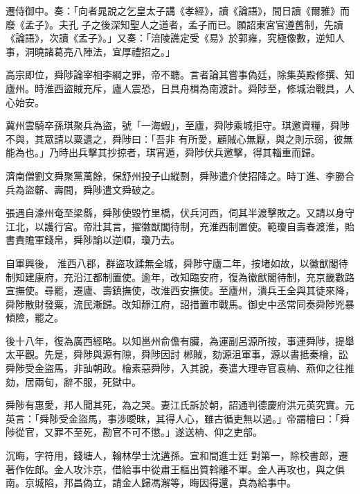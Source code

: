 \begin{pinyinscope}
 遷侍御中。奏：「向者晁說之乞皇太子講《孝經》，讀《論語》，間日讀《爾雅》而廢《孟子》。夫孔
 子之後深知聖人之道者，孟子而已。願詔東宮官遵舊制，先讀《論語》，次讀《孟子》。」又奏：「涪陵譙定受《易》於郭雍，究極像數，逆知人事，洞曉諸葛亮八陣法，宜厚禮招之。」



 高宗即位，舜陟論宰相李綱之罪，帝不聽。言者論其嘗事偽廷，除集英殿修撰、知廬州。時淮西盜賊充斥，廬人震恐，日具舟楫為南渡計。舜陟至，修城治戰具，人心始安。



 冀州雲騎卒孫琪聚兵為盜，號「一海蝦」，至廬，舜陟乘城拒守。琪邀資糧，舜陟不與，其眾請以粟遺之，舜陟曰：「吾非
 有所愛，顧賊心無厭，與之則示弱，彼無能為也。」乃時出兵擊其抄掠者，琪宵遁，舜陟伏兵邀擊，得其輜重而歸。



 濟南僧劉文舜聚黨萬餘，保舒州投子山縱剽，舜陟遣介使招降之。時丁進、李勝合兵為盜蘄、壽間，舜陟遣文舜破之。



 張遇自濠州奄至梁縣，舜陟使毀竹里橋，伏兵河西，伺其半渡擊敗之。又請以身守江北，以護行宮。帝壯其言，擢徽猷閣待制，充淮西制置使。範瓊自壽春渡淮，貽書責贍軍錢帛，舜陟諭以逆順，瓊乃去。



 自軍興後，
 淮西八郡，群盜攻蹂無全城，舜陟守廬二年，按堵如故，以徽猷閣待制知建康府，充沿江都制置使。逾年，改知臨安府，復為徽猷閣待制，充京畿數路宣撫使。尋罷，遷廬、壽鎮撫使，改淮西安撫使。至廬州，潰兵王全與其徒來降，舜陟散財發粟，流民漸歸。改知靜江府，詔措置市戰馬。御史中丞常同奏舜陟兇暴傾險，罷之。



 後十八年，復為廣西經略。以知邕州俞儋有臟，為運副呂源所按，事連舜陟，提舉太平觀。先是，舜陟與源有隙，舜陟因討
 郴賊，劾源沮軍事，源以書抵秦檜，訟舜陟受金盜馬，非訕朝政。檜素惡舜陟，入其說，奏遣大理寺官袁柟、燕仰之往推劾，居兩旬，辭不服，死獄中。



 舜陟有惠愛，邦人聞其死，為之哭。妻江氏訴於朝，詔通判德慶府洪元英究實。元英言：「舜陟受金盜馬，事涉曖昧，其得人心，雖古循吏無以過。」帝謂檜曰：「舜陟從官，又罪不至死，勘官不可不懲。」遂送柟、仰之吏部。



 沉晦，字符用，錢塘人，翰林學士沈遘孫。宣和間進士廷
 對第一，除校書郎，遷著作佐郎。金人攻汴京，借給事中從肅王樞出質斡離不軍。金人再攻也，與之俱南。京城陷，邦昌偽立，請金人歸馮澥等，晦因得還，真為給事中。




\end{pinyinscope}
